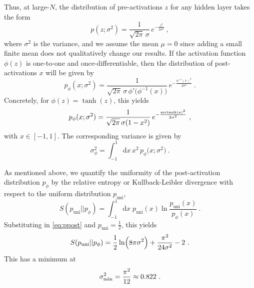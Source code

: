 Thus, at large-$N$, the distribution of pre-activations $z$ for any hidden layer takes the form
\begin{equation} \label{eq:pre}
	p (z ; \sigma^2 ) = \frac{1}{\sqrt{2 \pi} \, \sigma} \, e^{- \frac{z^2}{2 \sigma^2}}~,
\end{equation}
where $\sigma^2$ is the variance, and we assume the mean $\mu=0$ since adding a small finite mean does not qualitatively change our results. If the activation function $\phi (z)$ is one-to-one and once-differentiable, then the distribution of post-activations $x$ will be given by
%
\begin{equation} \label{eq:postgeneral}
	p_{\phi} (x ; \sigma^2 ) = \frac{1}{\sqrt{2 \pi} \, \sigma\,\phi' \bigl( \phi^{-1} (x) \bigr)} \, e^{- \frac{\phi^{-1} (x)^2}{2 \sigma^2}}~.
\end{equation}
%
Concretely, for $\phi (z) = \tanh (z)$, this yields
%
\begin{equation} \label{eq:ppost}
	p_{\phi} (x; \sigma^2 ) = \frac{1}{\sqrt{2 \pi} \, \sigma (1 - x^2 )} \, e^{- \frac{\rm{arctanh} (x)^2}{2 \sigma^2}}~,
\end{equation}
%
with $x\in[-1,1]$. The corresponding variance is given by
%
\begin{equation} \label{eq:varpost}
	\sigma_{\phi}^{2} = \int_{-1}^{1}\mathrm{d} x \, x^2 \, p_{\phi} \bigl( x ; \sigma^2 \bigr)~.
\end{equation}
%
%

As mentioned above, we quantify the uniformity of the post-activation distribution $p_\phi$ by the relative entropy or Kullback-Leibler divergence with respect to the uniform distribution $p_\mathrm{uni}$,
\begin{equation}
	S(p_\mathrm{uni}||p_\phi)
	=\int_{-1}^1\!\mathrm{d} x\;p_\mathrm{uni}(x)\ln\frac{p_\mathrm{uni}(x)}{p_\phi(x)}~.
\end{equation}
Substituting in \eqref{eq:ppost} and $p_\mathrm{uni}=\tfrac{1}{2}$, this yields
\begin{equation} \label{eq:relent}
	S( p_{\rm{uni}} || p_{\phi} ) = \frac{1}{2}\ln(8\pi\sigma^2)+\frac{\pi^2}{24 \sigma^2}-2~.
\end{equation}
%
This has a minimum at
%
\begin{equation} \label{eq:sigmamin}
	\sigma_{\rm{min}}^{2} = \frac{\pi^2}{12} \approx 0.822~.
\end{equation}
%

